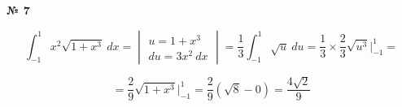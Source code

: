 \documentclass{article}
\begin{document}
\textbf{№ 7} 
\large

$$ \int_{-1}^{1} x^2 \sqrt{1+x^3} \ dx 
= \begin{vmatrix} u = 1+x^3 \\
                 du = 3x^2 \ dx \end{vmatrix}
= \frac{1}{3} \int_{-1}^{1} \sqrt{u} \ du
= \frac{1}{3} \times \frac{2}{3} \sqrt{u^3} \bigg\vert_{-1}^{1} 
= $$

$$ = \frac{2}{9} \sqrt{1+x^3} \bigg\vert_{-1}^{1} 
= \frac{2}{9} \left( \sqrt{8} - 0 \right)
= \frac{4\sqrt{2}}{9} $$
\end{document}
